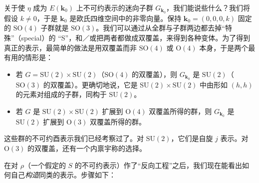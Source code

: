 关于使 $\eta$ 成为 $E(\mathbf{k}_0)$ 上不可约表示的迷向子群 $G_{\mathbf{k}_0}$，我们能说些什么？我们将假设 $k\neq0$，于是 $\mathbf{k}_0$ 是欧氏四维空间中的非零向量。保持 $\mathbf{k}_0=(0,0,0,k)$ 固定的 $\mathrm{SO}(4)$ 子群就是 $\mathrm{SO}(3)$。我们可以通过从全群与子群两边都去掉“特殊”（special）的 “S”，和／或把两者都做成双覆盖，来得到各种变体。为了得到真正的表示，最简单的做法是用双覆盖而非 $\mathrm{SO}(4)$ 或 $\mathrm{O}(4)$ 本身，于是两个最有用的情形是：

\begin{itemize}
\item 若 $G=\mathrm{SU}(2)\times\mathrm{SU}(2)$（$\mathrm{SO}(4)$ 的双覆盖），则 $G_{\mathbf{k}_0}$ 是 $\mathrm{SU}(2)$（$\mathrm{SO}(3)$ 的双覆盖）。更确切地说，它是 $\mathrm{SU}(2)\times\mathrm{SU}(2)$ 中由形如 $(h,h)$ 的元素对组成的子群，同构于 $\mathrm{SU}(2)$。
\item 若 $G$ 是 $\mathrm{SU}(2)\times\mathrm{SU}(2)$ 扩展到 $\mathrm{O}(4)$ 双覆盖所得的群，则 $G_{\mathbf{k}_0}$ 是 $\mathrm{SU}(2)$ 扩展到 $\mathrm{O}(3)$ 双覆盖所得的群。
\end{itemize}

这些群的不可约酉表示我们已经考察过了。对 $\mathrm{SU}(2)$，它们是自旋 $j$ 表示。对 $\mathrm{O}(3)$ 的双覆盖，还有一个内禀宇称的选择。

在对 $\rho$（一个假定的 $S$ 的不可约表示）作了“反向工程”之后，我们现在能看出如何自己\emph{构造}同类的表示。步骤如下：

